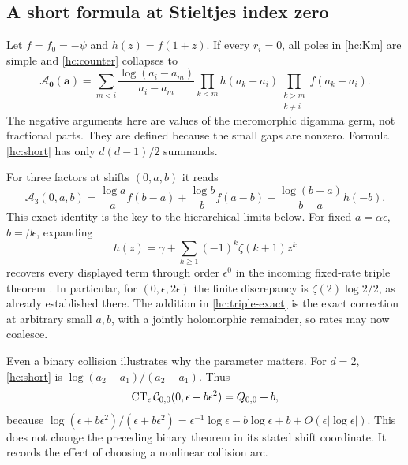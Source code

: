 \subsection{A short formula at Stieltjes index zero}

Let $f=f_0=-\psi$ and $h(z)=f(1+z)$. If every $r_i=0$, all poles in
\eqref{hc:Km} are simple and \eqref{hc:counter} collapses to
\begin{equation}\label{hc:short}
 \boxed{\quad
 \mathcal A_{\boldsymbol0}(\boldsymbol a)=
 \sum_{m<i}\frac{\log(a_i-a_m)}{a_i-a_m}
   \prod_{k<m}h(a_k-a_i)
   \prod_{\substack{k>m\\k\ne i}}f(a_k-a_i).
 \quad}
\end{equation}
The negative arguments here are values of the meromorphic digamma
germ, not fractional parts. They are defined because the small gaps
are nonzero. Formula \eqref{hc:short} has only $d(d-1)/2$ summands.

For three factors at shifts $(0,a,b)$ it reads
\begin{equation}\label{hc:triple-exact}
 \mathcal A_3(0,a,b)=
 \frac{\log a}{a}f(b-a)
 +\frac{\log b}{b}f(a-b)
 +\frac{\log(b-a)}{b-a}h(-b).
\end{equation}
This exact identity is the key to the hierarchical limits below. For
fixed $a=\alpha\epsilon$, $b=\beta\epsilon$, expanding
\begin{equation}\label{hc:hseries}
 h(z)=\gamma+\sum_{k\ge1}(-1)^k\zeta(k+1)z^k
\end{equation}
recovers every displayed term through order $\epsilon^0$ in the
incoming fixed-rate triple theorem \cite{RepoMixed}. In particular,
for $(0,\epsilon,2\epsilon)$ the finite discrepancy is
$\zeta(2)\log2/2$, as already established there. The addition in
\eqref{hc:triple-exact} is the exact correction at arbitrary small
$a,b$, with a jointly holomorphic remainder, so rates may now coalesce.

Even a binary collision illustrates why the parameter matters. For
$d=2$, \eqref{hc:short} is $\log(a_2-a_1)/(a_2-a_1)$. Thus
\begin{equation}\label{hc:binary-curved}
 \operatorname{CT}_{\epsilon}\mathcal C_{0,0}(0,\epsilon+b\epsilon^2)
     =Q_{0,0}+b,
\end{equation}
because
$\log(\epsilon+b\epsilon^2)/(\epsilon+b\epsilon^2)
 =\epsilon^{-1}\log\epsilon-b\log\epsilon+b+O(\epsilon|\log\epsilon|)$.
This does not change the preceding binary theorem in its stated shift
coordinate. It records the effect of choosing a nonlinear collision arc.

